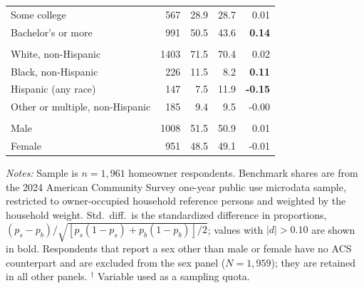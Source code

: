 \begin{table}[H]
\begin{threeparttable}
\begin{tabular}[t]{lrrrr}
\hspace{1em}Some college & 567 & 28.9 & 28.7 & 0.01\\
\hspace{1em}Bachelor's or more & 991 & 50.5 & 43.6 & \textbf{0.14}\\
\addlinespace[0.3em]
\multicolumn{5}{l}{\textit{Race and ethnicity}}\\
\hspace{1em}White, non-Hispanic & 1403 & 71.5 & 70.4 & 0.02\\
\hspace{1em}Black, non-Hispanic & 226 & 11.5 & 8.2 & \textbf{0.11}\\
\hspace{1em}Hispanic (any race) & 147 & 7.5 & 11.9 & \textbf{-0.15}\\
\hspace{1em}Other or multiple, non-Hispanic & 185 & 9.4 & 9.5 & -0.00\\
\addlinespace[0.3em]
\multicolumn{5}{l}{\textit{Sex}}\\
\hspace{1em}Male & 1008 & 51.5 & 50.9 & 0.01\\
\hspace{1em}Female & 951 & 48.5 & 49.1 & -0.01\\
\bottomrule
\end{tabular}
\begin{tablenotes}[flushleft]\footnotesize
\item \textit{Notes:} Sample is $\textit{n} = 1{,}961$ homeowner respondents.
Benchmark shares are from the 2024 American Community Survey one-year public use
microdata sample, restricted to owner-occupied household reference persons and
weighted by the household weight. Std.\ diff.\ is the standardized difference in
proportions, $(p_s - p_b)/\sqrt{[p_s(1-p_s) + p_b(1-p_b)]/2}$; values with
$|d| > 0.10$ are shown in bold. Respondents that report a sex other than male or
female have no ACS counterpart and are excluded from the sex panel ($N = 1{,}959$);
they are retained in all other panels.
$^{\dagger}$ Variable used as a sampling quota.
\end{tablenotes}
\end{threeparttable}
\end{table}
